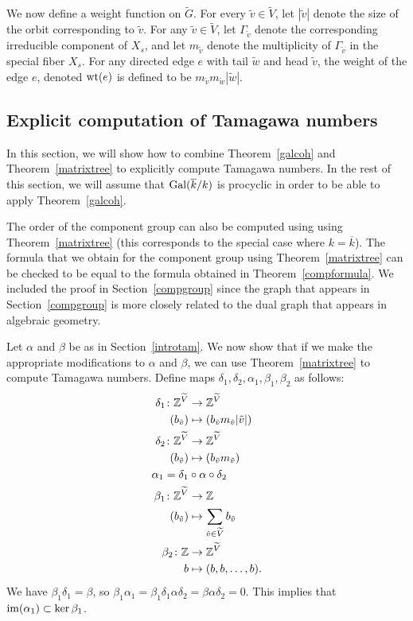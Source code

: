 We now define a weight function on $\widetilde{G}$. For every $\tilde{v} \in \widetilde{V}$, let $|\tilde{v}|$ denote the size of the orbit corresponding to $\tilde{v}$. For any $\tilde{v} \in \widetilde{V}$, let $\Gamma_{\tilde{v}}$ denote the corresponding irreducible component of $X_s$, and let $m_{\tilde{v}}$ denote the multiplicity of $\Gamma_{\tilde{v}}$ in the special fiber $X_s$. For any directed edge $e$ with tail $\tilde{w}$ and head $\tilde{v}$, the weight of the edge $e$, denoted $\operatorname{wt}(e)$ is defined to be $m_{\tilde{v}} m_{\tilde{w}} |\tilde{w}|$. 

\subsection{Explicit computation of Tamagawa numbers}
In this section, we will show how to combine Theorem~\ref{galcoh} and Theorem~\ref{matrixtree} to explicitly compute Tamagawa numbers. In the rest of this section, we will assume that $\operatorname{Gal} (\overline{k}/k)$ is procyclic in order to be able to apply Theorem~\ref{galcoh}.

\begin{rmk}
The order of the component group can also be computed using using Theorem~\ref{matrixtree} (this corresponds to the special case where $k = \overline{k}$). The formula that we obtain for the component group using Theorem~\ref{matrixtree} can be checked to be equal to the formula obtained in Theorem~\ref{compformula}. We included the proof in Section~\ref{compgroup} since the graph that appears in Section~\ref{compgroup} is more closely related to the dual graph that appears in algebraic geometry.
\end{rmk}

Let $\alpha$ and $\beta$ be as in Section~\ref{introtam}. We now show that if we make the appropriate modifications to $\alpha$ and $\beta$, we can use Theorem~\ref{matrixtree} to compute Tamagawa numbers. Define maps $\delta_1, \delta_2, \alpha_1,\beta_1,\beta_2$ as follows:
\begin{align*}
 \delta_1 \colon \mathbb Z^{\widetilde{V}} &\rightarrow \mathbb Z^{\widetilde{V}} \\
 (b_{\tilde{v}}) &\mapsto (b_{\tilde{v}}m_{\tilde{v}}|\tilde{v}|) \\
 \delta_2 \colon \mathbb Z^{\widetilde{V}} &\rightarrow \mathbb Z^{\widetilde{V}} \\
 (b_{\tilde{v}}) &\mapsto (b_{\tilde{v}}m_{\tilde{v}}) \\
\alpha_1 = \delta_1 &\circ \alpha \circ \delta_2 \\
\beta_1 \colon \mathbb Z^{\widetilde{V}} &\rightarrow \mathbb Z \\
 (b_{\tilde{v}}) &\mapsto \sum_{\tilde{v} \in \widetilde{V}} b_{\tilde{v}} \\
\beta_2 \colon \mathbb Z &\rightarrow \mathbb Z^{\widetilde{V}} \\
 b &\mapsto (b,b,\ldots,b)  .
\end{align*}
We have $\beta_1 \delta_1 = \beta$, so $\beta_1 \alpha_1 = \beta_1 \delta_1 \alpha \delta_2 = \beta \alpha \delta_2 = 0$. This implies that $\operatorname{im}(\alpha_1) \subset \ker{\beta_1}$.

